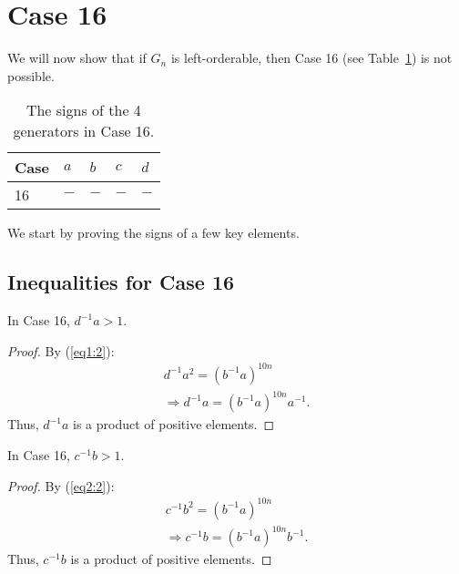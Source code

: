 \section{Case 16}
\label{section:case16}

\noindent{}We will now show that if $G_n$ is left-orderable, then Case 16 (see Table~\ref{table:case16}) is not possible.

\begin{table}[ht]
\begin{center}
\begin{tabular}{l | l | l | l | l}
Case\hspace{10 pt} & $a$\hspace{10 pt} & $b$\hspace{10 pt} & $c$\hspace{10 pt} & $d$\hspace{10 pt} \\\hline\hline
16 & $-$ & $-$ & $-$ & $-$
\end{tabular}
\end{center}
\caption{The signs of the 4 generators in Case 16.}
\label{table:case16}
\end{table}

\noindent{}We start by proving the signs of a few key elements.

\subsection{Inequalities for Case 16}

\begin{lemma} In Case 16, $d^{-1}a>1$.
\label{lemma:case16:Da}
\end{lemma}
\begin{proof}
By (\ref{eq1:2}):
\begin{align*}
d^{-1}a^{2}=(b^{-1}a)^{10n} \\
\Rightarrow{}d^{-1}a=(b^{-1}a)^{10n}a^{-1}.
\end{align*}
Thus, $d^{-1}a$ is a product of positive elements.\qedhere
\end{proof}

\begin{lemma} In Case 16, $c^{-1}b>1$.
\label{lemma:case16:Cb}
\end{lemma}
\begin{proof}
By (\ref{eq2:2}):
\begin{align*}
c^{-1}b^{2}=(b^{-1}a)^{10n}\\
\Rightarrow{}c^{-1}b=(b^{-1}a)^{10n}b^{-1}.
\end{align*}
Thus, $c^{-1}b$ is a product of positive elements.
\end{proof}


